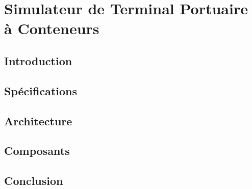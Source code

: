 

\chapter{Simulateur de Terminal Portuaire à Conteneurs}    \label{simulateur}


\section*{Introduction}

\section{Spécifications}
\section{Architecture}
\section{Composants}

\section*{Conclusion}


